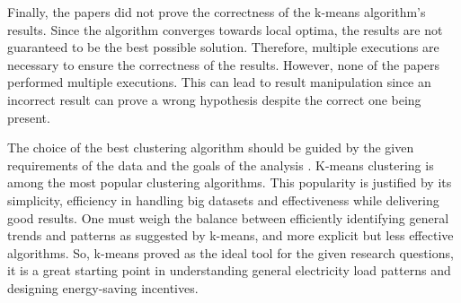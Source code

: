 Finally, the papers did not prove the correctness of the k-means algorithm's results.
Since the algorithm converges towards local optima, the results are not guaranteed to be the best possible solution.
Therefore, multiple executions are necessary to ensure the correctness of the results.
However, none of the papers performed multiple executions.
This can lead to result manipulation since an incorrect result can prove a wrong hypothesis despite the correct one being present.

The choice of the best clustering algorithm should be guided by the given requirements of the data and the goals of the analysis \cite{COL-ALT}.
K-means clustering is among the most popular clustering algorithms.
This popularity is justified by its simplicity, efficiency in handling big datasets and effectiveness while delivering good results.
One must weigh the balance between efficiently identifying general trends and patterns as suggested by k-means, and more explicit but less effective algorithms.
So, k-means proved as the ideal tool for the given research questions, it is a great starting point in understanding general electricity load patterns and designing energy-saving incentives.

